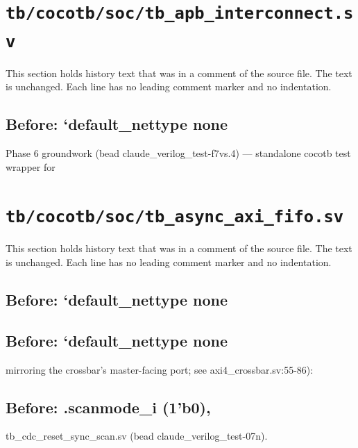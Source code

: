 \section{\texttt{tb/cocotb/soc/tb\_apb\_interconnect.sv}}\label{cr:suite:soc-tb-apb-interconnect-sv}

This section holds history text that was in a comment of the source file. The text is unchanged. Each line has no leading comment marker and no indentation.

\begin{record}

\subsection*{Before: `default\_nettype none}

\begin{textblock}
Phase 6 groundwork (bead claude_verilog_test-f7vs.4) — standalone cocotb test wrapper for
\end{textblock}

\end{record}

\section{\texttt{tb/cocotb/soc/tb\_async\_axi\_fifo.sv}}\label{cr:suite:soc-tb-async-axi-fifo-sv}

This section holds history text that was in a comment of the source file. The text is unchanged. Each line has no leading comment marker and no indentation.

\begin{record}

\subsection*{Before: `default\_nettype none}


\subsection*{Before: `default\_nettype none}

\begin{textblock}
mirroring the crossbar's master-facing port; see axi4_crossbar.sv:55-86):
\end{textblock}

\subsection*{Before: .scanmode\_i  (1'b0),}

\begin{textblock}
tb_cdc_reset_sync_scan.sv (bead claude_verilog_test-07n).
\end{textblock}

\end{record}

